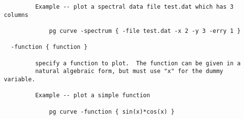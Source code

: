 \begin{verbatim}
         Example -- plot a spectral data file test.dat which has 3 columns

             pg curve -spectrum { -file test.dat -x 2 -y 3 -erry 1 }

  -function { function }

         specify a function to plot.  The function can be given in a
         natural algebraic form, but must use "x" for the dummy variable.

         Example -- plot a simple function

             pg curve -function { sin(x)*cos(x) }
\end{verbatim}


